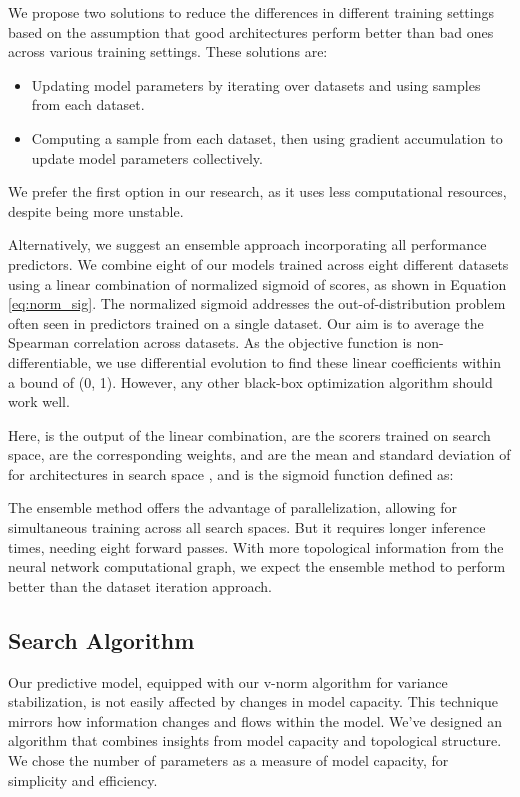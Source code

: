 \documentclass[lettersize,journal]{IEEEtran}
\begin{document}
            We propose two solutions to reduce the differences in different training settings based on the assumption that good architectures perform better than bad ones across various training settings. These solutions are:
            
            \begin{itemize}
            \item Updating model parameters by iterating over datasets and using samples from each dataset.
            \item Computing a sample from each dataset, then using gradient accumulation to update model parameters collectively.
            \end{itemize}
            
            We prefer the first option in our research, as it uses less computational resources, despite being more unstable.
            
            Alternatively, we suggest an ensemble approach incorporating all performance predictors. We combine eight of our models trained across eight different datasets using a linear combination of normalized sigmoid of scores, as shown in Equation \ref{eq:norm_sig}. The normalized sigmoid addresses the out-of-distribution problem often seen in predictors trained on a single dataset. Our aim is to average the Spearman correlation across datasets. As the objective function is non-differentiable, we use differential evolution to find these linear coefficients within a bound of (0, 1). However, any other black-box optimization algorithm should work well.
    
            
            
            Here,  is the output of the linear combination,  are the scorers trained on  search space,  are the corresponding weights,  and  are the mean and standard deviation of  for architectures  in search space , and  is the sigmoid function defined as:
            
            
            
            The ensemble method offers the advantage of parallelization, allowing for simultaneous training across all search spaces. But it requires longer inference times, needing eight forward passes. With more topological information from the neural network computational graph, we expect the ensemble method to perform better than the dataset iteration approach.
        


    \subsection{Search Algorithm} \label{sec:searchalgo}
        Our predictive model, equipped with our v-norm algorithm for variance stabilization, is not easily affected by changes in model capacity. This technique mirrors how information changes and flows within the model. We've designed an algorithm that combines insights from model capacity and topological structure. We chose the number of parameters as a measure of model capacity, for simplicity and efficiency.
        
\end{document}

